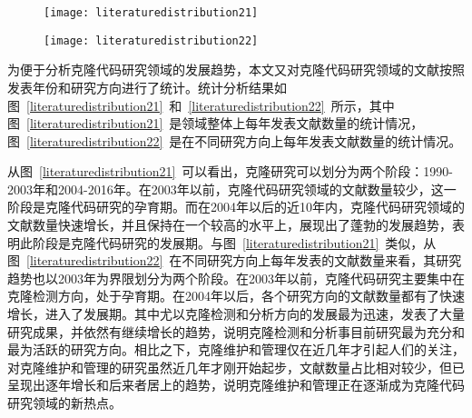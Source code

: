 \begin{figure}[htbp]
\centering
\texttt{[image: literaturedistribution21]}
\vspace{-1em}
\end{figure}

\begin{figure}[htbp]
\centering
\texttt{[image: literaturedistribution22]}
\vspace{-1em}
\end{figure}


为便于分析克隆代码研究领域的发展趋势，本文又对克隆代码研究领域的文献按照发表年份和研究方向进行了统计。统计分析结果如图~\ref{literaturedistribution21}~和~\ref{literaturedistribution22}~所示，其中图~\ref{literaturedistribution21}~是领域整体上每年发表文献数量的统计情况，图~\ref{literaturedistribution22}~是在不同研究方向上每年发表文献数量的统计情况。

从图~\ref{literaturedistribution21}~可以看出，克隆研究可以划分为两个阶段：1990-2003年和2004-2016年。在2003年以前，克隆代码研究领域的文献数量较少，这一阶段是克隆代码研究的孕育期。而在2004年以后的近10年内，克隆代码研究领域的文献数量快速增长，并且保持在一个较高的水平上，展现出了蓬勃的发展趋势，表明此阶段是克隆代码研究的发展期。与图~\ref{literaturedistribution21}~类似，从图~\ref{literaturedistribution22}~在不同研究方向上每年发表的文献数量来看，其研究趋势也以2003年为界限划分为两个阶段。在2003年以前，克隆代码研究主要集中在克隆检测方向，处于孕育期。在2004年以后，各个研究方向的文献数量都有了快速增长，进入了发展期。其中尤以克隆检测和分析方向的发展最为迅速，发表了大量研究成果，并依然有继续增长的趋势，说明克隆检测和分析事目前研究最为充分和最为活跃的研究方向。相比之下，克隆维护和管理仅在近几年才引起人们的关注，对克隆维护和管理的研究虽然近几年才刚开始起步，文献数量占比相对较少，但已呈现出逐年增长和后来者居上的趋势，说明克隆维护和管理正在逐渐成为克隆代码研究领域的新热点。


